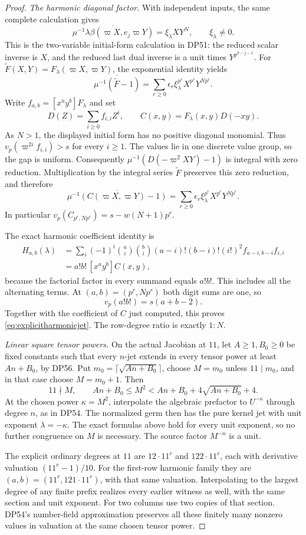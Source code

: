 \documentclass[11pt,a4paper]{article}
\theoremstyle{definition}\newtheorem{remark}[theorem]{Remark}
\begin{document}
\begin{proof}
\emph{The harmonic diagonal factor.}
With independent inputs, the same complete calculation gives
\[
 \overline{\mu^{-1}\lambda\beta(\varpi X,e_j\varpi Y)}
 =\xi_\lambda XY^N,\qquad \xi_\lambda\ne0.
\]
This is the two-variable initial-form calculation in DP51: the reduced scalar inverse is $X$, and the reduced last dual inverse is a unit times $Y^{p^{h-j-1}}$.
For $\widetilde F(X,Y)=F_\lambda(\varpi X,\varpi Y)$, the exponential identity yields
\[
 \overline{\mu^{-1}(\widetilde F-1)}
 =\sum_{r\ge0}\epsilon_r\xi_\lambda^{p^r}
       X^{p^r}Y^{Np^r}.
\]
Write $f_{a,b}=[x^ay^b]F_\lambda$ and set
\[
 D(Z)=\sum_{i\ge0}f_{i,i}Z^i,
 \qquad C(x,y)=F_\lambda(x,y)D(-xy).
\]
As $N>1$, the displayed initial form has no positive diagonal monomial.
Thus $v_p(\varpi^{2i}f_{i,i})>s$ for every $i\ge1$.
The values lie in one discrete value group, so the gap is uniform.
Consequently $\mu^{-1}(D(-\varpi^2XY)-1)$ is integral with zero reduction.
Multiplication by the integral series $\widetilde F$ preserves this zero reduction, and therefore
\[
 \overline{\mu^{-1}(C(\varpi X,\varpi Y)-1)}
 =\sum_{r\ge0}\epsilon_r\xi_\lambda^{p^r}
       X^{p^r}Y^{Np^r}.
\]
In particular $v_p(C_{p^r,Np^r})=s-w(N+1)p^r$.

The exact harmonic coefficient identity is
\begin{align*}
 H_{a,b}(\lambda)
 &=\sum_i(-1)^i\binom ai\binom bi
 (a-i)!(b-i)!(i!)^2 f_{a-i,b-i}f_{i,i}\\
 &=a!b!\,[x^ay^b]C(x,y),
\end{align*}
because the factorial factor in every summand equals $a!b!$.
This includes all the alternating terms.
At $(a,b)=(p^r,Np^r)$ both digit sums are one, so
\[
 v_p(a!b!)=s(a+b-2).
\]
Together with the coefficient of $C$ just computed, this proves \eqref{eq:explicitharmonicjet}.
The row-degree ratio is exactly $1:N$.

\emph{Linear square tensor powers.}
On the actual Jacobian at $11$, let $A\ge1,B_0\ge0$ be fixed constants such that every $n$-jet extends in every tensor power at least $An+B_0$, by DP56.
Put $m_0=\lceil\sqrt{An+B_0}\rceil$, choose $M=m_0$ unless $11\mid m_0$, and in that case choose $M=m_0+1$.
Then
\[
 11\nmid M,
 \qquad An+B_0\le M^2
 <An+B_0+4\sqrt{An+B_0}+4.
\]
At the chosen power $\kappa=M^2$, interpolate the algebraic prefactor to $U^{-\kappa}$ through degree $n$, as in DP54.
The normalized germ then has the pure kernel jet with unit exponent $\lambda=-\kappa$.
The exact formulas above hold for every unit exponent, so no further congruence on $M$ is necessary.
The source factor $M^{-n}$ is a unit.

The explicit ordinary degrees at $11$ are $12\cdot11^r$ and $122\cdot11^r$, each with derivative valuation $(11^r-1)/10$.
For the first-row harmonic family they are $(a,b)=(11^r,121\cdot11^r)$, with that same valuation.
Interpolating to the largest degree of any finite prefix realizes every earlier witness as well, with the same section and unit exponent.
For two columns use two copies of that section.
DP54's number-field approximation preserves all these finitely many nonzero values in valuation at the same chosen tensor power.
\end{proof}
\end{document}
